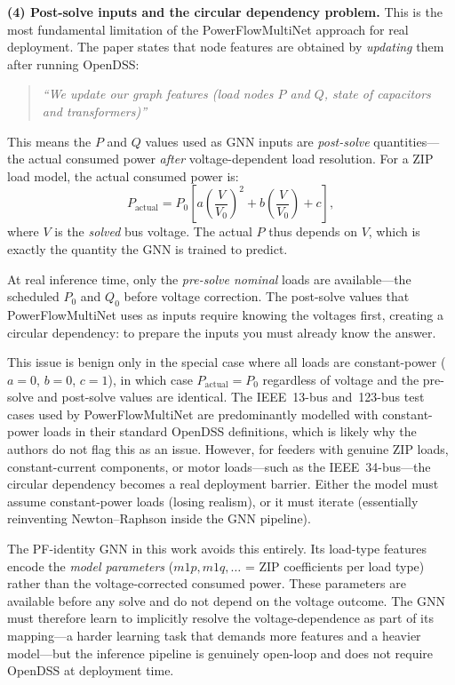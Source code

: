 \documentclass[11pt]{article}
\begin{document}
\textbf{(4) Post-solve inputs and the circular dependency problem.}
This is the most fundamental limitation of the PowerFlowMultiNet approach
for real deployment.  The paper states that node features are obtained by
\emph{updating} them after running OpenDSS:

\begin{quote}
\emph{``We update our graph features (load nodes $P$ and $Q$, state of
capacitors and transformers)''} \cite{Ghamizi2024}
\end{quote}

This means the $P$ and $Q$ values used as GNN inputs are \emph{post-solve}
quantities---the actual consumed power \emph{after} voltage-dependent load
resolution.  For a ZIP load model, the actual consumed power is:
\[
P_{\text{actual}} = P_0\!\left[a\!\left(\frac{V}{V_0}\right)^{\!2}
  + b\!\left(\frac{V}{V_0}\right) + c\right],
\]
where $V$ is the \emph{solved} bus voltage.  The actual $P$ thus depends on
$V$, which is exactly the quantity the GNN is trained to predict.

At real inference time, only the \emph{pre-solve nominal} loads are
available---the scheduled $P_0$ and $Q_0$ before voltage correction.  The
post-solve values that PowerFlowMultiNet uses as inputs require knowing the
voltages first, creating a circular dependency: to prepare the inputs you
must already know the answer.

This issue is benign only in the special case where all loads are
constant-power ($a=0$, $b=0$, $c=1$), in which case
$P_{\text{actual}} = P_0$ regardless of voltage and the pre-solve and
post-solve values are identical.  The IEEE~13-bus and~123-bus test cases
used by PowerFlowMultiNet are predominantly modelled with constant-power
loads in their standard OpenDSS definitions, which is likely why the authors
do not flag this as an issue.  However, for feeders with genuine ZIP loads,
constant-current components, or motor loads---such as the IEEE~34-bus---the
circular dependency becomes a real deployment barrier.  Either the model must
assume constant-power loads (losing realism), or it must iterate (essentially
reinventing Newton--Raphson inside the GNN pipeline).

The PF-identity GNN in this work avoids this entirely.  Its load-type
features encode the \emph{model parameters} ($m1p, m1q, \ldots$ = ZIP
coefficients per load type) rather than the voltage-corrected consumed
power.  These parameters are available before any solve and do not depend
on the voltage outcome.  The GNN must therefore learn to implicitly resolve
the voltage-dependence as part of its mapping---a harder learning task that
demands more features and a heavier model---but the inference pipeline is
genuinely open-loop and does not require OpenDSS at deployment time.
\end{document}
